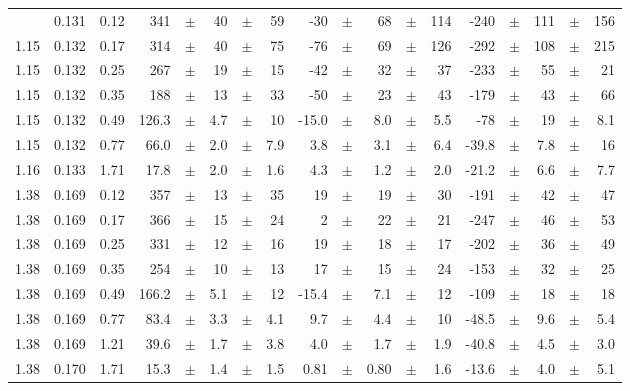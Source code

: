 \documentclass[prc,floatfix,twocolumn,superscriptaddress,letter]{revtex4}
\begin{document}
\begin{longtable}{ccc@{\extracolsep{1cm}}d@{\extracolsep{0pt}}cdcd@{\extracolsep{1cm}}d@{\extracolsep{0pt}}cdcd@{\extracolsep{1cm}}d@{\extracolsep{0pt}}cdcd}
\hline \hline
{} & 0.131 & 0.12 	&	 341	 &  $\pm$	& 40 &	 $\pm$	& 59 &	 -30 &	$\pm$& 	 68 &	$\pm$& 	 114 & -240 & $\pm$ & 111 & 	$\pm$ & 156\\
1.15 & 0.132 & 0.17 	&	 314	 &  $\pm$	& 40 &	 $\pm$	& 75 &	 -76 &	$\pm$& 	 69 &	$\pm$& 	 126 & -292 & $\pm$ & 108 & 	$\pm$ & 215\\
1.15 & 0.132 & 0.25 	&	 267	 &  $\pm$	& 19 &	 $\pm$	& 15 &	 -42 &	$\pm$& 	 32 &	$\pm$& 	 37 & -233 & $\pm$ & 55 & 	$\pm$ & 21\\
1.15 & 0.132 & 0.35 	&	 188	 &  $\pm$	& 13 &	 $\pm$	& 33 &	 -50 &	$\pm$& 	 23 &	$\pm$& 	 43 & -179 & $\pm$ & 43 & 	$\pm$ & 66\\
1.15 & 0.132 & 0.49 	&	 126.3	 &  $\pm$	& 4.7 &	 $\pm$	& 10 &	 -15.0 &	$\pm$& 	 8.0 &	$\pm$& 	 5.5 & -78 & $\pm$ & 19 & 	$\pm$ & 8.1\\
1.15 & 0.132 & 0.77 	&	 66.0	 &  $\pm$	& 2.0 &	 $\pm$	& 7.9 &	 3.8 &	$\pm$& 	 3.1 &	$\pm$& 	 6.4 & -39.8 & $\pm$ & 7.8 & 	$\pm$ & 16\\
1.16 & 0.133 & 1.71 	&	 17.8	 &  $\pm$	& 2.0 &	 $\pm$	& 1.6 &	 4.3 &	$\pm$& 	 1.2 &	$\pm$& 	 2.0 & -21.2 & $\pm$ & 6.6 & 	$\pm$ & 7.7\\
1.38 & 0.169 & 0.12 	&	 357	 &  $\pm$	& 13 &	 $\pm$	& 35 &	 19 &	$\pm$& 	 19 &	$\pm$& 	 30 & -191 & $\pm$ & 42 & 	$\pm$ & 47\\
1.38 & 0.169 & 0.17 	&	 366	 &  $\pm$	& 15 &	 $\pm$	& 24 &	 2 &	$\pm$& 	 22 &	$\pm$& 	 21 & -247 & $\pm$ & 46 & 	$\pm$ & 53\\
1.38 & 0.169 & 0.25 	&	 331	 &  $\pm$	& 12 &	 $\pm$	& 16 &	 19 &	$\pm$& 	 18 &	$\pm$& 	 17 & -202 & $\pm$ & 36 & 	$\pm$ & 49\\
1.38 & 0.169 & 0.35 	&	 254	 &  $\pm$	& 10 &	 $\pm$	& 13 &	 17 &	$\pm$& 	 15 &	$\pm$& 	 24 & -153 & $\pm$ & 32 & 	$\pm$ & 25\\
1.38 & 0.169 & 0.49 	&	 166.2	 &  $\pm$	& 5.1 &	 $\pm$	& 12 &	 -15.4 &	$\pm$& 	 7.1 &	$\pm$& 	 12 & -109 & $\pm$ & 18 & 	$\pm$ & 18\\
1.38 & 0.169 & 0.77 	&	 83.4	 &  $\pm$	& 3.3 &	 $\pm$	& 4.1 &	 9.7 &	$\pm$& 	 4.4 &	$\pm$& 	 10 & -48.5 & $\pm$ & 9.6 & 	$\pm$ & 5.4\\
1.38 & 0.169 & 1.21 	&	 39.6	 &  $\pm$	& 1.7 &	 $\pm$	& 3.8 &	 4.0 &	$\pm$& 	 1.7 &	$\pm$& 	 1.9 & -40.8 & $\pm$ & 4.5 & 	$\pm$ & 3.0\\
1.38 & 0.170 & 1.71 	&	 15.3	 &  $\pm$	& 1.4 &	 $\pm$	& 1.5 &	 0.81 &	$\pm$& 	 0.80 &	$\pm$& 	 1.6 & -13.6 & $\pm$ & 4.0 & 	$\pm$ & 5.1\\

\end{longtable}
\end{document}
